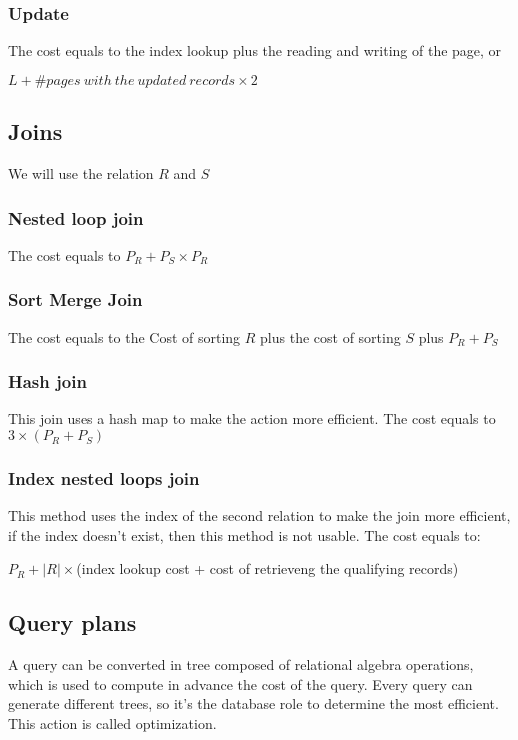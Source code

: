 \documentclass[12pt, a4paper]{article}
\begin{document}
\subsubsection*{Update}
The cost equals to the index lookup plus the reading and writing of the page, or 
\begin{center}
    $L + \# pages\ with\ the\ updated\ records\times 2$    
\end{center}

\subsection{Joins}
We will use the relation $R$ and $S$
\subsubsection*{Nested loop join}
The cost equals to $P_{R}+P_{S}\times P_{R}$

\subsubsection{Sort Merge Join}
The cost equals to the Cost of sorting $R$ plus the cost of sorting $S$ plus $P_{R}+P_{S}$

\subsubsection*{Hash join}
This join uses a hash map to make the action more efficient. The cost equals to $3\times(P_{R}+P_{S})$

\subsubsection*{Index nested loops join}
This method uses the index of the second relation to make the join more efficient, if the index doesn't exist, then
this method is not usable. The cost equals to:
\begin{center}
    $P_{R}+|R|\times$(index lookup cost + cost of retrieveng the qualifying records)
\end{center}


\subsection{Query plans}
A query can be converted in tree composed of relational algebra operations, which is used to compute in advance the 
cost of the query. Every query can generate different trees, so it's the database role to determine the most 
efficient. This action is called optimization.
\end{document}
